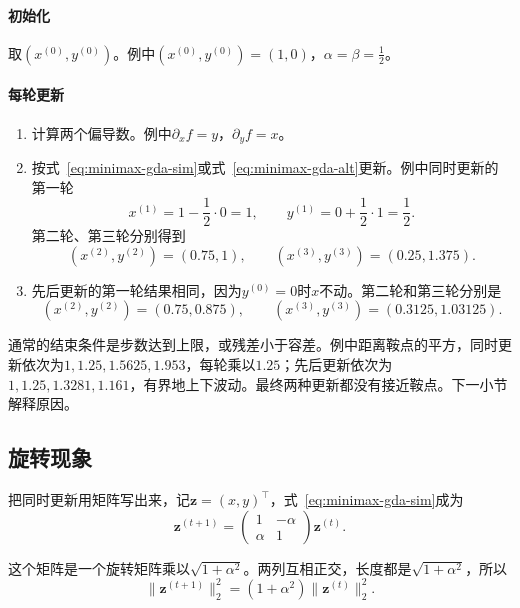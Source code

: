 \paragraph{初始化}
取$(x^{(0)},y^{(0)})$。例中$(x^{(0)},y^{(0)})=(1,0)$，$\alpha=\beta=\frac12$。

\paragraph{每轮更新}
\begin{enumerate}
 \item 计算两个偏导数。例中$\partial_xf=y$，$\partial_yf=x$。
 \item 按式~\eqref{eq:minimax-gda-sim}或式~\eqref{eq:minimax-gda-alt}更新。例中同时更新的第一轮
 \[
  x^{(1)}=1-\frac12\cdot0=1,\qquad y^{(1)}=0+\frac12\cdot1=\frac12.
 \]
 第二轮、第三轮分别得到
 \[
  (x^{(2)},y^{(2)})=(0.75,1),\qquad(x^{(3)},y^{(3)})=(0.25,1.375).
 \]
 \item 先后更新的第一轮结果相同，因为$y^{(0)}=0$时$x$不动。第二轮和第三轮分别是
 \[
  (x^{(2)},y^{(2)})=(0.75,0.875),\qquad(x^{(3)},y^{(3)})=(0.3125,1.03125).
 \]
\end{enumerate}

通常的结束条件是步数达到上限，或残差小于容差。例中距离鞍点的平方，同时更新依次为$1,1.25,1.5625,1.953$，每轮乘以$1.25$；先后更新依次为$1,1.25,1.3281,1.161$，有界地上下波动。最终两种更新都没有接近鞍点。下一小节解释原因。

\subsection{旋转现象}
\label{sec:minimax-rotation}

把同时更新用矩阵写出来，记$\bm{z}=(x,y)^\top$，式~\eqref{eq:minimax-gda-sim}成为
\begin{equation}
 \bm{z}^{(t+1)}=\begin{pmatrix}1&-\alpha\\\alpha&1\end{pmatrix}\bm{z}^{(t)}.
 \label{eq:minimax-gda-matrix}
\end{equation}

这个矩阵是一个旋转矩阵乘以$\sqrt{1+\alpha^2}$。两列互相正交，长度都是$\sqrt{1+\alpha^2}$，所以
\begin{equation}
 \lVert\bm{z}^{(t+1)}\rVert_2^2=(1+\alpha^2)\lVert\bm{z}^{(t)}\rVert_2^2.
 \label{eq:minimax-gda-growth}
\end{equation}

